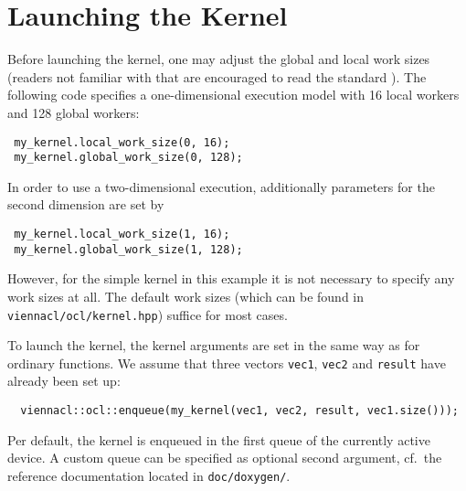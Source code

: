 \section{Launching the {\OpenCL} Kernel}
Before launching the kernel, one may adjust the global and local work sizes (readers not familiar with that are encouraged to read the {\OpenCL} standard \cite{khronoscl}).
The following code specifies a one-dimensional execution model with 16 local workers and 128 global workers:
\begin{lstlisting}
 my_kernel.local_work_size(0, 16);
 my_kernel.global_work_size(0, 128);
\end{lstlisting}
In order to use a two-dimensional execution, additionally parameters for the second dimension are set by
\begin{lstlisting}
 my_kernel.local_work_size(1, 16);
 my_kernel.global_work_size(1, 128);
\end{lstlisting}
However, for the simple kernel in this example it is not necessary to specify any work sizes at all. The default work sizes (which can be found in \texttt{viennacl/ocl/kernel.hpp}) suffice for most cases.

To launch the kernel, the kernel arguments are set in the same way as for ordinary functions. We assume that three {\ViennaCL} vectors \lstinline|vec1|, \lstinline|vec2| and \lstinline|result| have already been set up:
\begin{lstlisting}
  viennacl::ocl::enqueue(my_kernel(vec1, vec2, result, vec1.size()));
\end{lstlisting}
Per default, the kernel is enqueued in the first queue of the currently active device. A custom queue can be specified as optional second argument, cf.~the reference documentation
located in \texttt{doc/doxygen/}.

